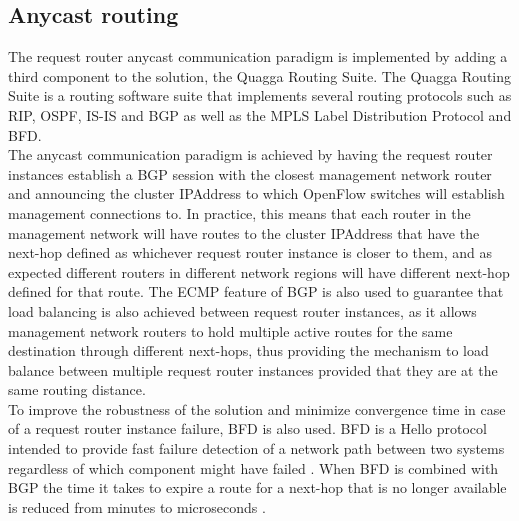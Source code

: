 \subsection{Anycast routing}
\label{subsection:anycast-implementation}
The request router anycast communication paradigm is implemented by adding a third component to the solution, the Quagga Routing Suite.
The Quagga Routing Suite is a routing software suite that implements several routing protocols such as \gls{RIP}, \gls{OSPF}, \gls{IS-IS} and \gls{BGP} as well as the \gls{MPLS} Label Distribution Protocol and \gls{BFD}.\\
%
The anycast communication paradigm is achieved by having the request router instances establish a \gls{BGP} session with the closest management network router and announcing the cluster \gls{IPAddress} to which OpenFlow switches will establish management connections to.
In practice, this means that each router in the management network will have routes to the cluster \gls{IPAddress} that have the next-hop defined as whichever request router instance is closer to them, and as expected different routers in different network regions will have different next-hop defined for that route.
The \gls{ECMP} feature of \gls{BGP} is also used to guarantee that load balancing is also achieved between request router instances, as it allows management network routers to hold multiple active routes for the same destination through different next-hops, thus providing the mechanism to load balance between multiple request router instances provided that they are at the same routing distance.\\
%
To improve the robustness of the solution and minimize convergence time in case of a request router instance failure, \gls{BFD} is also used.
\gls{BFD} is a Hello protocol intended to provide fast failure detection of a network path between two systems regardless of which component might have failed \cite{rfc5880}.
When \gls{BFD} is combined with \gls{BGP} the time it takes to expire a route for a next-hop that is no longer available is reduced from minutes to microseconds \cite{rfc5880}\cite{rfc4271}.

